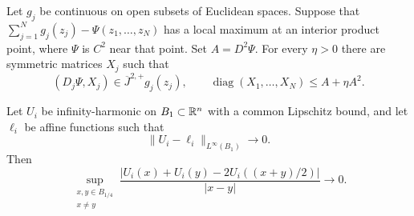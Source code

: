 \begin{lemma}\label{lem:sum-rule}
Let $g_j$ be continuous on open subsets of Euclidean spaces. Suppose that $\sum_{j=1}^N g_j(z_j)-\Psi(z_1,\ldots,z_N)$ has a local maximum at an interior product point, where $\Psi$ is $C^2$ near that point. Set $A=D^2\Psi$. For every $\eta>0$ there are symmetric matrices $X_j$ such that
\[
  (D_j\Psi,X_j)\in\overline J^{2,+}g_j(z_j),\qquad
  \operatorname{diag}(X_1,\ldots,X_N)\le A+\eta A^2.
\]
\end{lemma}

\begin{proposition}\label{prop:three-point}
Let $U_i$ be infinity-harmonic on $B_1\subset\mathbb{R}^n$ with a common Lipschitz bound, and let $\ell_i$ be affine functions such that
\[
  \|U_i-\ell_i\|_{L^\infty(B_1)}\longrightarrow0.
\]
Then
\begin{equation}\label{eq:three-point}
  \sup_{\substack{x,y\in B_{1/4}\\x\ne y}}
  \frac{|U_i(x)+U_i(y)-2U_i((x+y)/2)|}{|x-y|}
  \longrightarrow0.
\end{equation}
\end{proposition}

